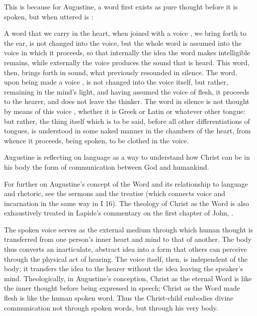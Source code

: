 This is because for Augustine, a word first exists as pure thought before it is
spoken, but when uttered is :
\begin{quoting}
    A word  that we carry in the heart, when
    joined with a voice , we bring
    forth to the ear, is not changed into the voice, but the whole word is
    assumed into the voice in which it proceeds, so that internally the idea the
    word makes intelligible remains, while externally the voice produces the
    sound that is heard.
    This word, then, brings forth in sound, what previously resounded in
    silence.  The word, upon being made a voice , is
    not changed into the voice itself, but rather, remaining in the mind's
    light, and having assumed the voice  of flesh, it proceeds to
    the hearer, and does not leave the thinker.
    The word in silence is not thought by means of this voice ,
    whether it is Greek or Latin or whatever other tongue: but rather, the thing
    itself which is to be said, before all other differentiations of tongues, is
    understood in some naked manner in the chambers of the heart, from whence it
    proceeds, being spoken, to be clothed in the voice.%
    \Autocite[1002, Sermo 187, In Natali Domini 4]{Augustine:SermonesPL}
\end{quoting}
Augustine is reflecting on language as a way to understand how Christ can be in
his body the form of communication between God and
humankind.%
\begin{Footnote}
    For further on Augustine's concept of the Word and its relationship to
    language and rhetoric, see the sermons  and the
    treatise  (which connects voice and
    incarnation in the same way in I 16).
    The theology of Christ as the Word is also exhaustively treated in Lapide's
    commentary on the first chapter of John,
    \autocite[872--889]{Lapide:Gospels19C}.
\end{Footnote}

The spoken voice serves as the external medium through which human thought is
transferred from one person's inner heart and mind to that of another.
The body thus converts an inarticulate, abstract idea into a form that others
can perceive through the physical act of hearing.
The voice itself, then, is independent of the body; it transfers the idea to the
hearer without the idea leaving the speaker's mind.
Theologically, in Augustine's conception, Christ as the eternal Word is like the
inner thought before being expressed in speech; Christ as the Word made flesh is
like the human spoken word.
Thus the Christ-child embodies divine communication not through spoken words,
but through his very body.

